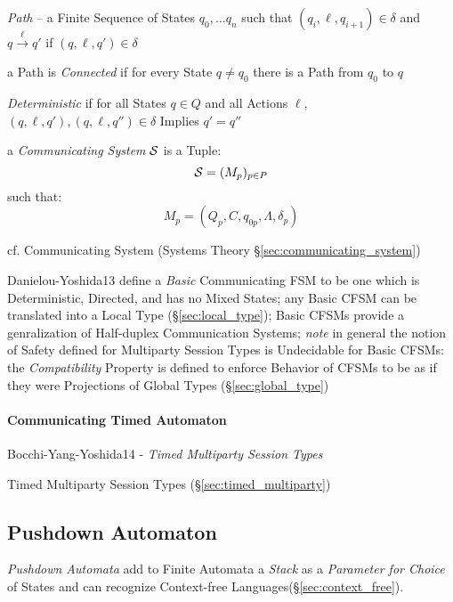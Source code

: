 \emph{Path} -- a Finite Sequence of States $q_0, \ldots q_n$ such that
$(q_i, \ell, q_{i+1}) \in \delta$ and $q \xrightarrow{\ell} q'$ if
$(q,\ell,q') \in \delta$

a Path is \emph{Connected} if for every State $q \neq q_0$ there is a
Path from $q_0$ to $q$

\emph{Deterministic} if for all States $q \in Q$ and all Actions
$\ell$, $(q,\ell,q'),(q,\ell,q'') \in \delta$ Implies $q' = q''$

a \emph{Communicating System} $\mathcal{S}$ is a Tuple:
\[
  \mathcal{S} = (M_p)_{p \in P}
\]
such that:
\[
  M_p = (Q_p, C, q_{0p}, \Lambda, \delta_p)
\]

\fist cf. Communicating System (Systems Theory
\S\ref{sec:communicating_system}) %

Danielou-Yoshida13 define a \emph{Basic} Communicating FSM to be one
which is Deterministic, Directed, and has no Mixed States; any Basic
CFSM can be translated into a Local Type (\S\ref{sec:local_type});
Basic CFSMs provide a genralization of Half-duplex Communication
Systems; \emph{note} in general the notion of Safety defined for
Multiparty Session Types is Undecidable for Basic CFSMs: the
\emph{Compatibility} Property is defined to enforce Behavior of CFSMs
to be as if they were Projections of Global Types
(\S\ref{sec:global_type})



\paragraph{Communicating Timed Automaton}
\label{sec:communicating_timed_fsm}\hfill

Bocchi-Yang-Yoshida14 - \emph{Timed Multiparty Session Types}

Timed Multiparty Session Types (\S\ref{sec:timed_multiparty})



\subsection{Pushdown Automaton}\label{sec:pushdown_automaton}

\emph{Pushdown Automata} add to Finite Automata a \emph{Stack} as a
\emph{Parameter for Choice} of States and can recognize Context-free
Languages(\S\ref{sec:context_free}).

